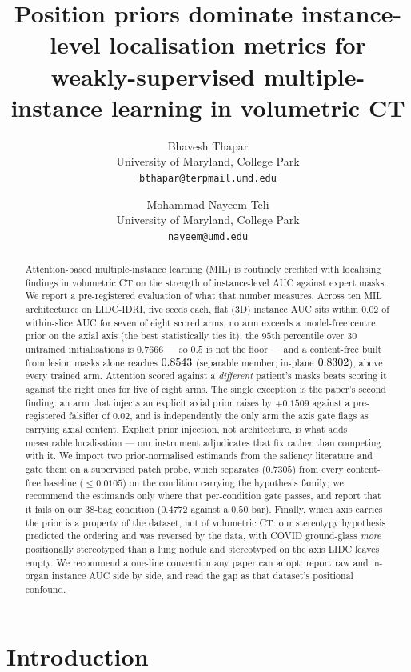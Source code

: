 \documentclass[10pt]{article}
\title{Position priors dominate instance-level localisation metrics for\\
weakly-supervised multiple-instance learning in volumetric CT}
\author{
  Bhavesh Thapar\\
  University of Maryland, College Park\\
  \texttt{bthapar@terpmail.umd.edu}
  \and
  Mohammad Nayeem Teli\\
  University of Maryland, College Park\\
  \texttt{nayeem@umd.edu}
}
\date{}
\begin{document}
\maketitle

\begin{abstract}
Attention-based multiple-instance learning (MIL) is routinely credited with
localising findings in volumetric CT on the strength of instance-level AUC
against expert masks. We report a pre-registered evaluation of what that number
measures. Across ten MIL architectures on LIDC-IDRI, five seeds each, flat (3D)
instance AUC sits within $0.02$ of within-slice AUC for seven of eight scored
arms, no arm exceeds a model-free centre prior on the axial axis (the best
statistically ties it), the $95$th
percentile over $30$ untrained initialisations is $0.7666$ --- so $0.5$ is not
the floor --- and a content-free \maskref{} built from lesion masks alone
reaches $0.8543$ (separable member; in-plane $0.8302$), above
every trained arm. Attention scored against a \emph{different} patient's masks
beats scoring it against the right ones for five of eight arms.
The single exception is the paper's second finding: an arm that injects an
explicit axial prior raises \pss{} by $+0.1509$ against a pre-registered
falsifier of $0.02$, and is independently the only arm the axis gate flags as
carrying axial content. Explicit prior injection, not architecture, is what adds
measurable localisation --- our instrument adjudicates that fix rather than
competing with it. We import two prior-normalised estimands from the saliency
literature and gate them on a supervised patch probe, which separates
($0.7305$) from every content-free baseline ($\leq 0.0105$) on the condition
carrying the hypothesis family; we recommend the estimands only where that
per-condition gate passes, and report that it fails on our $38$-bag condition
($0.4772$ against a $0.50$ bar). Finally, which axis carries the prior is a
property of the dataset, not of volumetric CT: our stereotypy hypothesis
predicted the ordering and was reversed by the data, with COVID ground-glass
\emph{more} positionally stereotyped than a lung nodule and stereotyped on the
axis LIDC leaves empty. We recommend a one-line convention any paper can adopt:
report raw and in-organ instance AUC side by side, and read the gap as that
dataset's positional confound.
\end{abstract}

\section{Introduction}
\end{document}
